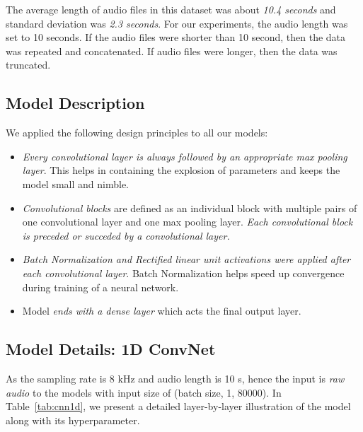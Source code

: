 \documentclass[runningheads]{llncs}
\begin{document}
The average length of audio files in this dataset was about \emph{10.4 seconds} and standard deviation was \emph{2.3 seconds}. For our experiments, the audio length was set to 10 seconds. If the audio files were shorter than 10 second, then the data was repeated and concatenated. If audio files were longer, then the data was truncated. 

\subsection{Model Description}

We applied the following design principles to all our models:

\begin{itemize}
	\item \emph{Every convolutional layer is always followed by an appropriate max pooling layer}. This helps in containing the explosion of parameters and keeps the model small and nimble.
	\item \emph{Convolutional blocks} are defined as an individual block with multiple pairs of one convolutional layer and one max pooling layer. \emph{Each convolutional block is preceded or succeded by a convolutional layer.}
    \item \emph{Batch Normalization and Rectified linear unit activations were applied after each convolutional layer}. Batch Normalization helps speed up convergence during training of a neural network.
	\item Model \emph{ends with a dense layer} which acts the final output layer.
\end{itemize}


\subsection{Model Details: 1D ConvNet}
\label{sec:1dcnn}
As the sampling rate is 8 kHz and audio length is 10 s, hence the input is \emph{raw audio} to the models with input size of (batch size, 1, 80000). In Table~\ref{tab:cnn1d}, we present a detailed layer-by-layer illustration of the model along with its hyperparameter.
\end{document}

